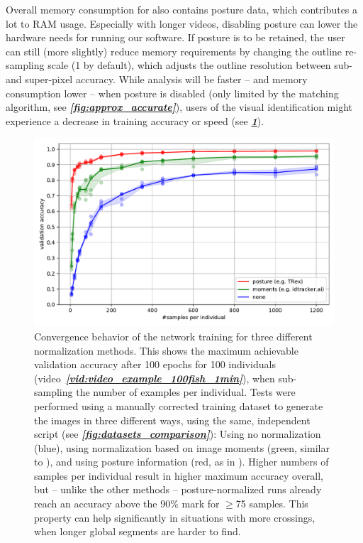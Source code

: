 \documentclass[9pt,lineno]{elife}
\newcommand{\figref}[1]{\textit{\textbf{\ref{#1}}}}
\newcommand{\videoref}[1]{video~\textit{\textbf{\ref{#1}}}}
\newcommand{\idtracker}{\protect\path{ idtracker.ai}}
\newcommand{\TRex}{\protect\path{TRex}}
\begin{document}
Overall memory consumption for \TRex{} also contains posture data, which contributes a lot to RAM usage. Especially with longer videos, disabling posture can lower the hardware needs for running our software. If posture is to be retained, the user can still (more slightly) reduce memory requirements by changing the outline re-sampling scale (1 by default), which adjusts the outline resolution between sub- and super-pixel accuracy. While analysis will be faster -- and memory consumption lower -- when posture is disabled (only limited by the matching algorithm, see \figref{fig:approx_accurate}), users of the visual identification might experience a decrease in training accuracy or speed (see \figref{fig:maximum_val_acc_per_samples}).

\begin{figure}[h]
\includegraphics[width=0.9\linewidth]{figures/raw_posture_moments.pdf}
\caption{Convergence behavior of the network training for three different normalization methods. This shows the maximum achievable validation accuracy after 100 epochs for 100 individuals (\videoref{vid:video_example_100fish_1min}), when sub-sampling the number of examples per individual. Tests were performed using a manually corrected training dataset to generate the images in three different ways, using the same, independent script (see \figref{fig:datasets_comparison}): Using no normalization (blue), using normalization based on image moments (green, similar to \idtracker{}), and using posture information (red, as in \TRex{}). Higher numbers of samples per individual result in higher maximum accuracy overall, but -- unlike the other methods -- posture-normalized runs already reach an accuracy above the 90\% mark for $\geq$75 samples. This property can help significantly in situations with more crossings, when longer global segments are harder to find.}
\label{fig:maximum_val_acc_per_samples}
\end{figure}
\end{document}
